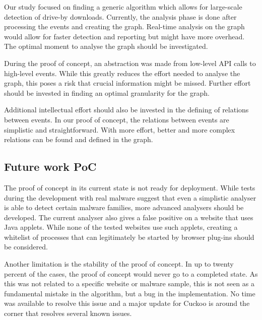 Our study focused on finding a generic algorithm which allows for large-scale detection of drive-by downloads. Currently, the analysis phase is done after processing the events and creating the graph. Real-time analysis on the graph would allow for faster detection and reporting but might have more overhead. The optimal moment to analyse the graph should be investigated.

During the proof of concept, an abstraction was made from low-level API calls to high-level events. While this greatly reduces the effort needed to analyse the graph, this poses a risk that crucial information might be missed. Further effort should be invested in finding an optimal granularity for the graph.

Additional intellectual effort should also be invested in the defining of relations between events. In our proof of concept, the relations between events are simplistic and straightforward. With more effort, better and more complex relations can be found and defined in the graph.

\subsection{Future work PoC}

The proof of concept in its current state is not ready for deployment. While tests during the development with real malware suggest that even a simplistic analyser is able to detect certain malware families, more advanced analysers should be developed. The current analyser also gives a false positive on a website that uses Java applets. While none of the tested websites use such applets, creating a whitelist of processes that can legitimately be started by browser plug-ins should be considered.

Another limitation is the stability of the proof of concept. In up to twenty percent of the cases, the proof of concept would never go to a completed state. As this was not related to a specific website or malware sample, this is not seen as a fundamental mistake in the algorithm, but a bug in the implementation. No time was available to resolve this issue and a major update for Cuckoo is around the corner that resolves several known issues.
